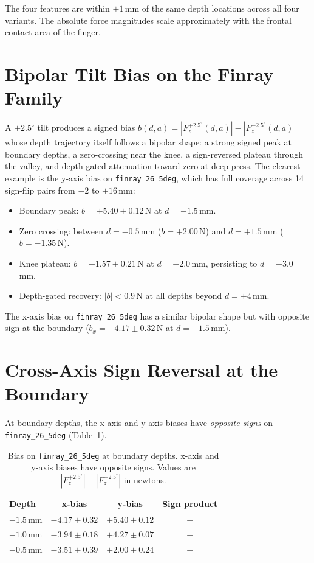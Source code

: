 The four features are within $\pm 1$\,mm of the same depth locations
across all four variants. The absolute force magnitudes scale
approximately with the frontal contact area of the finger.

\section{Bipolar Tilt Bias on the Finray Family}
\label{sec:bipolar-bias-results}

A $\pm 2.5^{\circ}$ tilt produces a signed bias
$b(d,a) = |F_z^{+2.5^{\circ}}(d,a)| - |F_z^{-2.5^{\circ}}(d,a)|$
whose depth trajectory itself follows a bipolar shape: a strong signed
peak at boundary depths, a zero-crossing near the knee, a sign-reversed
plateau through the valley, and depth-gated attenuation toward zero at
deep press. The clearest example is the y-axis bias on
\texttt{finray\_26\_5deg}, which has full coverage across 14 sign-flip
pairs from $-2$ to $+16$\,mm:

\begin{itemize}
  \item Boundary peak: $b = +5.40 \pm 0.12$\,N at $d = -1.5$\,mm.
  \item Zero crossing: between $d = -0.5$\,mm ($b = +2.00$\,N) and
        $d = +1.5$\,mm ($b = -1.35$\,N).
  \item Knee plateau: $b = -1.57 \pm 0.21$\,N at $d = +2.0$\,mm,
        persisting to $d = +3.0$\,mm.
  \item Depth-gated recovery: $|b| < 0.9$\,N at all depths beyond
        $d = +4$\,mm.
\end{itemize}

The x-axis bias on \texttt{finray\_26\_5deg} has a similar bipolar
shape but with opposite sign at the boundary
($b_x = -4.17 \pm 0.32$\,N at $d = -1.5$\,mm).

\section{Cross-Axis Sign Reversal at the Boundary}
\label{sec:cross-axis-results}

At boundary depths, the x-axis and y-axis biases have \emph{opposite
signs} on \texttt{finray\_26\_5deg} (Table~\ref{tab:cross-axis-sign}).

\begin{table}[ht]
\centering
\caption[Cross-axis bias sign reversal at boundary]{Bias on
\texttt{finray\_26\_5deg} at boundary depths. x-axis and y-axis biases
have opposite signs. Values are
$|F_z^{+2.5^{\circ}}|-|F_z^{-2.5^{\circ}}|$ in newtons.}
\label{tab:cross-axis-sign}
\begin{tabular}{lccc}
\toprule
Depth & x-bias & y-bias & Sign product \\
\midrule
$-1.5$\,mm & $-4.17 \pm 0.32$ & $+5.40 \pm 0.12$ & $-$ \\
$-1.0$\,mm & $-3.94 \pm 0.18$ & $+4.27 \pm 0.07$ & $-$ \\
$-0.5$\,mm & $-3.51 \pm 0.39$ & $+2.00 \pm 0.24$ & $-$ \\
\bottomrule
\end{tabular}
\end{table}


